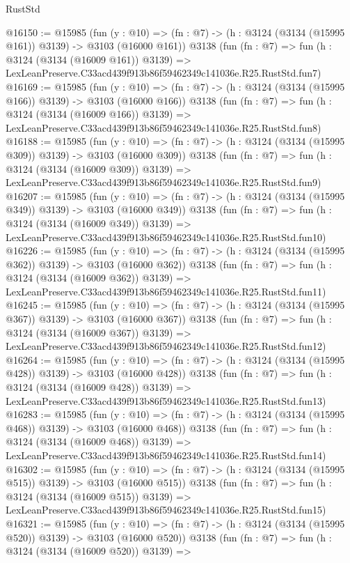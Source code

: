 \begin{lexlean}{RustStd}
\begin{coremodule}
@16150 := @15985
    (fun (y : @10) => (fn : @7) -> (h : @3124 (@3134 (@15995 @161)) @3139) -> @3103 (@16000 @161))
    @3138
    (fun (fn : @7) =>
    fun (h : @3124 (@3134 (@16009 @161)) @3139) =>
    LexLeanPreserve.C33acd439f913b86f59462349c141036e.R25.RustStd.fun7)
@16169 := @15985
    (fun (y : @10) => (fn : @7) -> (h : @3124 (@3134 (@15995 @166)) @3139) -> @3103 (@16000 @166))
    @3138
    (fun (fn : @7) =>
    fun (h : @3124 (@3134 (@16009 @166)) @3139) =>
    LexLeanPreserve.C33acd439f913b86f59462349c141036e.R25.RustStd.fun8)
@16188 := @15985
    (fun (y : @10) => (fn : @7) -> (h : @3124 (@3134 (@15995 @309)) @3139) -> @3103 (@16000 @309))
    @3138
    (fun (fn : @7) =>
    fun (h : @3124 (@3134 (@16009 @309)) @3139) =>
    LexLeanPreserve.C33acd439f913b86f59462349c141036e.R25.RustStd.fun9)
@16207 := @15985
    (fun (y : @10) => (fn : @7) -> (h : @3124 (@3134 (@15995 @349)) @3139) -> @3103 (@16000 @349))
    @3138
    (fun (fn : @7) =>
    fun (h : @3124 (@3134 (@16009 @349)) @3139) =>
    LexLeanPreserve.C33acd439f913b86f59462349c141036e.R25.RustStd.fun10)
@16226 := @15985
    (fun (y : @10) => (fn : @7) -> (h : @3124 (@3134 (@15995 @362)) @3139) -> @3103 (@16000 @362))
    @3138
    (fun (fn : @7) =>
    fun (h : @3124 (@3134 (@16009 @362)) @3139) =>
    LexLeanPreserve.C33acd439f913b86f59462349c141036e.R25.RustStd.fun11)
@16245 := @15985
    (fun (y : @10) => (fn : @7) -> (h : @3124 (@3134 (@15995 @367)) @3139) -> @3103 (@16000 @367))
    @3138
    (fun (fn : @7) =>
    fun (h : @3124 (@3134 (@16009 @367)) @3139) =>
    LexLeanPreserve.C33acd439f913b86f59462349c141036e.R25.RustStd.fun12)
@16264 := @15985
    (fun (y : @10) => (fn : @7) -> (h : @3124 (@3134 (@15995 @428)) @3139) -> @3103 (@16000 @428))
    @3138
    (fun (fn : @7) =>
    fun (h : @3124 (@3134 (@16009 @428)) @3139) =>
    LexLeanPreserve.C33acd439f913b86f59462349c141036e.R25.RustStd.fun13)
@16283 := @15985
    (fun (y : @10) => (fn : @7) -> (h : @3124 (@3134 (@15995 @468)) @3139) -> @3103 (@16000 @468))
    @3138
    (fun (fn : @7) =>
    fun (h : @3124 (@3134 (@16009 @468)) @3139) =>
    LexLeanPreserve.C33acd439f913b86f59462349c141036e.R25.RustStd.fun14)
@16302 := @15985
    (fun (y : @10) => (fn : @7) -> (h : @3124 (@3134 (@15995 @515)) @3139) -> @3103 (@16000 @515))
    @3138
    (fun (fn : @7) =>
    fun (h : @3124 (@3134 (@16009 @515)) @3139) =>
    LexLeanPreserve.C33acd439f913b86f59462349c141036e.R25.RustStd.fun15)
@16321 := @15985
    (fun (y : @10) => (fn : @7) -> (h : @3124 (@3134 (@15995 @520)) @3139) -> @3103 (@16000 @520))
    @3138
    (fun (fn : @7) =>
    fun (h : @3124 (@3134 (@16009 @520)) @3139) =>

\end{coremodule}
\end{lexlean}
